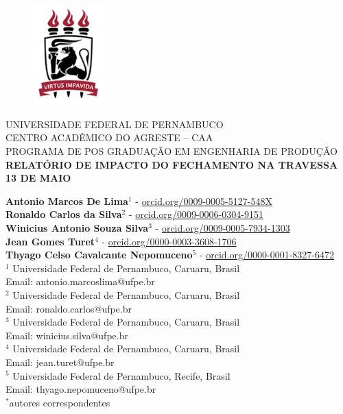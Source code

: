 \begin{center}
    \begin{figure}
        \centering
        \includegraphics[width=2.8cm]{Imagens/logoufpe (2).png}
    \end{figure}      
        UNIVERSIDADE FEDERAL DE PERNAMBUCO\\
        CENTRO ACADÊMICO DO AGRESTE – CAA\\
        PROGRAMA DE POS GRADUAÇÃO EM ENGENHARIA DE PRODUÇÃO\\
    \vspace{1cm}
        \textbf{RELATÓRIO DE IMPACTO DO FECHAMENTO  NA TRAVESSA 13 DE MAIO}
        
    \vspace{2cm}
    

    
    \textbf{Antonio Marcos De Lima}$^1$ - \href{https://orcid.org/0009-0005-5127-548X}{orcid.org/0009-0005-5127-548X} \\
    \textbf{Ronaldo Carlos da Silva}$^2$ - \href{https://orcid.org/0009-0006-0304-9151}{orcid.org/0009-0006-0304-9151} \\ 
    \textbf{Winicius Antonio Souza Silva}$^3$ - \href{https://orcid.org/0009-0005-7934-1303}{orcid.org/0009-0005-7934-1303}\\
     \textbf{Jean Gomes Turet}$^4$ - \href{https://orcid.org/0000-0003-3608-1706}{orcid.org/0000-0003-3608-1706} \\  
    \textbf{Thyago Celso Cavalcante Nepomuceno}$^5$ - \href{https://orcid.org/0000-0001-8327-6472}{orcid.org/0000-0001-8327-6472} \\  

   
    $^1$ Universidade Federal de Pernambuco, Caruaru, Brasil \\ Email: antonio.marcoslima@ufpe.br \\
     $^2$ Universidade Federal de Pernambuco, Caruaru, Brasil \\ Email: ronaldo.carlos@ufpe.br \\
    $^3$ Universidade Federal de Pernambuco, Caruaru, Brasil \\ Email: winicius.silva@ufpe.br \\
    $^4$ Universidade Federal de Pernambuco, Caruaru, Brasil \\ Email: jean.turet@ufpe.br\\
    $^5$ Universidade Federal de Pernambuco, Recife, Brasil \\ Email: thyago.nepomuceno@ufpe.br \\
    $^*$autores correspondentes
    \vspace{6pt}


\end{center}
